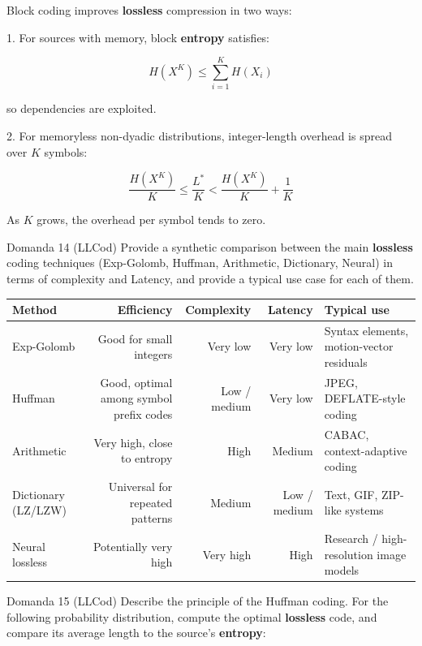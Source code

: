 Block coding improves \textbf{lossless} compression in two ways:

1. For sources with memory, block \textbf{entropy} satisfies:


$$
H(X^K) \le \sum_{i=1}^{K}H(X_i)
$$


so dependencies are exploited.

2. For memoryless non-dyadic distributions, integer-length overhead is spread over $K$ symbols:


$$
\frac{H(X^K)}{K} \le \frac{L^*}{K} < \frac{H(X^K)}{K} + \frac{1}{K}
$$


As $K$ grows, the overhead per symbol tends to zero.



\begin{questionbox}{Domanda 14}
(LLCod) Provide a synthetic comparison between the main \textbf{lossless} coding techniques (Exp-Golomb, Huffman, Arithmetic, Dictionary, Neural) in terms of complexity and Latency, and provide a typical use case for each of them.
\end{questionbox}



\begin{center}
\begin{tabular}{ | l | r | r | r | l | }
\hline
\textbf{Method} & \textbf{Efficiency} & \textbf{Complexity} & \textbf{Latency} & \textbf{Typical use} \\
\hline
Exp-Golomb & Good for small integers & Very low & Very low & Syntax elements, motion-vector residuals \\
\hline
Huffman & Good, optimal among symbol prefix codes & Low / medium & Very low & JPEG, DEFLATE-style coding \\
\hline
Arithmetic & Very high, close to entropy & High & Medium & CABAC, context-adaptive coding \\
\hline
Dictionary (LZ/LZW) & Universal for repeated patterns & Medium & Low / medium & Text, GIF, ZIP-like systems \\
\hline
Neural lossless & Potentially very high & Very high & High & Research / high-resolution image models \\
\hline
\end{tabular}
\end{center}


\begin{questionbox}{Domanda 15}
(LLCod) Describe the principle of the Huffman coding. For the following probability distribution, compute the optimal \textbf{lossless} code, and compare its average length to the source’s \textbf{entropy}:
\end{questionbox}

